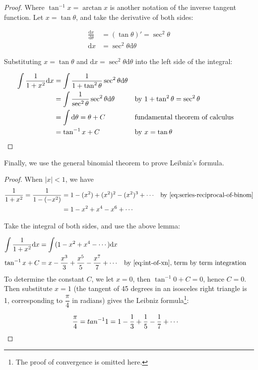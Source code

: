 \documentclass[b5paper]{article}
\begin{document}
\begin{proof}
Where $\tan^{-1} x = \arctan x$ is another notation of the inverse tangent function. Let $x = \tan \theta$, and take the derivative of both sides:

\begin{align*}
\frac{\mathrm{d} x}{\mathrm{d} \theta} &= (\tan \theta)' = \sec^2 \theta \\
\mathrm{d} x &= \sec^2 \theta \mathrm{d} \theta
\end{align*}

Substituting $x = \tan \theta$ and $\mathrm{d} x = \sec^2 \theta \mathrm{d} \theta$ into the left side of the integral:

\begin{align*}
\int \frac{1}{1 + x^2} \mathrm{d} x &= \int \frac{1}{1 + \tan^2 \theta} \sec^2 \theta \mathrm{d} \theta \\
  &= \int \frac{1}{\sec^2 \theta} \sec^2 \theta \mathrm{d} \theta &&\text{by } 1 + \tan^2 \theta = \sec^2 \theta \\
  &= \int \mathrm{d} \theta = \theta + C && \text{fundamental theorem of calculus} \\
  &= \tan^{-1} x + C &&\text{by } x = \tan \theta \qedhere
\end{align*}
\end{proof}

Finally, we use the general binomial theorem to prove Leibniz's formula.

\begin{proof}
When $|x| < 1$, we have
  \begin{align*}
\frac{1}{1 + x^2} = \frac{1}{1 - (-x^2)} &= 1 - (x^2) + (x^2)^2 - (x^2)^3 + \dotsb & \text{by \cref{eq:series-reciprocal-of-binom}} \\
  &= 1 - x^2 + x^4 - x^6 + \dotsb
  \end{align*}

Take the integral of both sides, and use the above lemma:

\begin{align*}
\int \frac{1}{1 + x^2} \mathrm{d} x &= \int (1 - x^2 + x^4 - \dotsb) \mathrm{d} x \\
\tan^{-1} x + C &= x - \frac{x^3}{3} + \frac{x^5}{5} - \frac{x^7}{7} + \dotsb &&\text{by \cref{eq:int-of-xn}, term by term integration}
\end{align*}
To determine the constant $C$, we let $x = 0$, then $\tan^{-1} 0 + C = 0$, hence $C = 0$. Then substitute $x = 1$ (the tangent of 45 degrees in an isosceles right triangle is 1, corresponding to $\dfrac{\pi}{4}$ in radians) gives the Leibniz formula\footnote{The proof of convergence is omitted here.}:

\begin{align*}
\frac{\pi}{4} = tan^{-1} 1 = 1 - \frac{1}{3} + \frac{1}{5} - \frac{1}{7} + \dotsb && \qedhere
\end{align*}
\end{proof}
\end{document}
